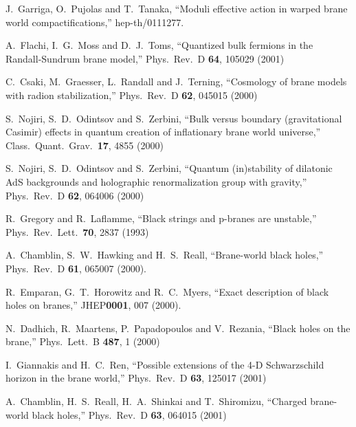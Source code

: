 \documentclass[a4paper,showpacs,preprintnumbers,amsmath,amssymb]{revtex4}
\begin{document}
\begin{thebibliography}{99}
J.~Garriga, O.~Pujolas and T.~Tanaka,
 ``Moduli effective action in warped brane world compactifications,'' hep-th/0111277.

 
A.~Flachi, I.~G.~Moss and D.~J.~Toms,
 ``Quantized bulk fermions in the Randall-Sundrum brane model,''
Phys.\ Rev.\ D {\bf 64}, 105029 (2001)
 
   
 
C.~Csaki, M.~Graesser, L.~Randall and J.~Terning,
 ``Cosmology of brane models with radion stabilization,''
Phys.\ Rev.\ D {\bf 62}, 045015 (2000)

 
S.~Nojiri, S.~D.~Odintsov and S.~Zerbini,
 ``Bulk versus boundary (gravitational Casimir) effects in quantum  creation of inflationary brane world universe,''
Class.\ Quant.\ Grav.\  {\bf 17}, 4855 (2000)
 
 
 
S.~Nojiri, S.~D.~Odintsov and S.~Zerbini,
 ``Quantum (in)stability of dilatonic AdS backgrounds and holographic  renormalization group with gravity,''
Phys.\ Rev.\ D {\bf 62}, 064006 (2000)
 


 





R.~Gregory and R.~Laflamme,
 ``Black strings and p-branes are unstable,''
Phys.\ Rev.\ Lett.\  {\bf 70}, 2837 (1993)
  

A.~Chamblin, S.~W.~Hawking and H.~S.~Reall,
 ``Brane-world black holes,''
Phys.\ Rev.\ D {\bf 61}, 065007 (2000).
 
 
R.~Emparan, G.~T.~Horowitz and R.~C.~Myers,
 ``Exact description of black holes on branes,''
JHEP{\bf 0001}, 007 (2000).
    
  
N.~Dadhich, R.~Maartens, P.~Papadopoulos and V.~Rezania,
 ``Black holes on the brane,''
Phys.\ Lett.\ B {\bf 487}, 1 (2000)
 
 
I.~Giannakis and H.~C.~Ren,
 ``Possible extensions of the 4-D Schwarzschild horizon in the brane  world,''
Phys.\ Rev.\ D {\bf 63}, 125017 (2001)
  
 
A.~Chamblin, H.~S.~Reall, H.~A.~Shinkai and T.~Shiromizu,
 ``Charged brane-world black holes,''
Phys.\ Rev.\ D {\bf 63}, 064015 (2001)
  

\end{thebibliography}
\end{document}

